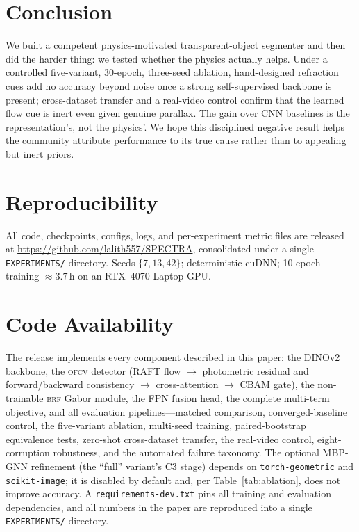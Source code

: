 \documentclass{bmvc2k}
\newcommand{\ofcv}{\textsc{ofcv}}
\newcommand{\brf}{\textsc{brf}}
\newcommand{\dinov}{DINOv2}
\begin{document}
\section{Conclusion}
We built a competent physics-motivated transparent-object segmenter and then did
the harder thing: we tested whether the physics actually helps. Under a
controlled five-variant, 30-epoch, three-seed ablation, hand-designed refraction
cues add no accuracy beyond noise once a strong self-supervised backbone is
present; cross-dataset transfer and a real-video control confirm that the
learned flow cue is inert even given genuine parallax. The gain over CNN
baselines is the representation's, not the physics'. We hope this disciplined
negative result helps the community attribute performance to its true cause
rather than to appealing but inert priors.

\section*{Reproducibility}
All code, checkpoints, configs, logs, and per-experiment metric files are
released at \url{https://github.com/lalith557/SPECTRA}, consolidated under a
single \texttt{EXPERIMENTS/} directory.%
Seeds $\{7,13,42\}$; deterministic cuDNN; 10-epoch training ${\approx}3.7$\,h on
an RTX~4070 Laptop GPU.

\section*{Code Availability}
The release implements every component described in this paper: the \dinov{}
backbone, the \ofcv{} detector (RAFT flow $\rightarrow$ photometric residual and
forward/backward consistency $\rightarrow$ cross-attention $\rightarrow$ CBAM
gate), the non-trainable \brf{} Gabor module, the FPN fusion head, the complete
multi-term objective, and all evaluation pipelines---matched comparison,
converged-baseline control, the five-variant ablation, multi-seed training,
paired-bootstrap equivalence tests, zero-shot cross-dataset transfer, the
real-video control, eight-corruption robustness, and the automated failure
taxonomy. The optional MBP-GNN refinement (the ``full'' variant's C3 stage)
depends on \texttt{torch-geometric} and \texttt{scikit-image}; it is disabled by
default and, per Table~\ref{tab:ablation}, does not improve accuracy. A
\texttt{requirements-dev.txt} pins all training and evaluation dependencies, and
all numbers in the paper are reproduced into a single \texttt{EXPERIMENTS/}
directory.
\end{document}

